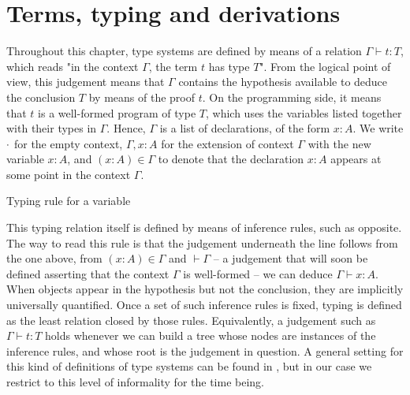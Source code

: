 \section{Terms, typing and derivations}
\label{sec:tech-typing}

Throughout this chapter, type systems are defined by means of a relation
$\Gamma \vdash t : T$, which reads "in the context $\Gamma$, the term $t$ has type $T$".
From the logical point of view, this judgement means that $\Gamma$
contains the hypothesis available to deduce the
conclusion $T$ by means of the proof $t$.
On the programming side, it means that $t$ is a well-formed program of type $T$,
which uses the variables listed together with their types in $\Gamma$.
Hence, $\Gamma$ is a list of declarations, of the form $x : A$.
We write $\emptycon$ for the empty context,
$\Gamma, x : A$ for the extension of context $\Gamma$ with the new variable $x : A$,
and $(x : A) \in \Gamma$ to denote that the declaration $x : A$ appears at some
point in the context $\Gamma$.

\begin{marginfigure}
  \ContinuedFloat*
  \begin{mathpar}
  \label{rule:cic-var}
  \end{mathpar}
  \caption{Typing rule for a variable}
  \label{fig:cic-var}
\end{marginfigure}

This typing relation itself is defined by means of inference rules,
such as  opposite. The way to read this rule is that the judgement
underneath the line follows from the one above,
\ie from $(x : A) \in \Gamma$
and $\vdash \Gamma$ – a judgement that will soon be defined asserting that the context
$\Gamma$ is well-formed – we can deduce $\Gamma \vdash x : A$.
When objects appear in the hypothesis but not the conclusion, they are implicitly
universally quantified.
Once a set of such inference rules is fixed,
typing is defined as the least relation closed by those
rules. Equivalently, a judgement such as $\Gamma \vdash t : T$
holds whenever we can build a tree whose nodes are instances of the inference rules,
and whose root is the judgement in question. A general setting
for this kind of definitions of type systems can be found in ,
but in our case we restrict to this level of informality for the time being.%


